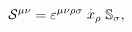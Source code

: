 \begin{equation}
\mathcal{S}^{\mu \nu }=\varepsilon ^{\mu \nu \rho \sigma }\stackrel{.}{x}
_{\rho }\Bbb{S}_{\sigma },
\end{equation}


